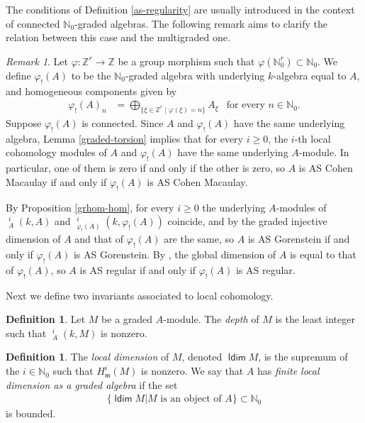 \documentclass[11pt,fleqn]{article}
\theoremstyle{plain}
\theoremstyle{remark}
\newtheorem{Remark}[Theorem]{Remark}
\theoremstyle{definition}
\newtheorem{Definition}[Theorem]{Definition}
\newcommand\NN{\mathbb N}
\newcommand\ZZ{\mathbb Z}
\renewcommand\to{\longrightarrow}
\renewcommand\phi{\varphi}
\newcommand\m{\mathfrak m}
\DeclareMathOperator\GrExt{\underline{\mathsf{Ext}}}
\DeclareMathOperator\ldim{\mathsf{ldim}}
\begin{document}
The conditions of Definition \ref{as-regularity} are usually introduced in the context
of connected $\NN_0$-graded algebras. The following remark aims to clarify the relation
between this case and the multigraded one.
\begin{Remark}
\label{AS-phi}
Let $\phi: \ZZ^r \to \ZZ$ be a group morphism such that $\phi(\NN_0^r) \subset \NN_0$. We
define $\phi_!(A)$ to be the $\NN_0$-graded algebra with underlying $k$-algebra equal to
$A$, and homogeneous components given by
\begin{align*}
\phi_!(A)_n &= \bigoplus_{\{\xi \in \ZZ^r \mid \phi(\xi) = n\}} A_\xi &\mbox{for every } n
\in \NN_0.
\end{align*}
Suppose $\phi_!(A)$ is connected. Since $A$ and $\phi_!(A)$ have the same underlying
algebra, Lemma \ref{graded-torsion} implies that for every $i \geq 0$, the $i$-th local 
cohomology modules of $A$ and $\phi_!(A)$ have the same underlying $A$-module. In
particular, one of them is zero if and only if the other is zero, so $A$ is AS Cohen
Macaulay if and only if $\phi_!(A)$ is AS Cohen Macaulay. 

By Proposition \ref{grhom-hom}, for every $i \geq 0$ the underlying $A$-modules of
$\GrExt^i_A(k,A)$ and $\GrExt^i_{\phi_!(A)}(k,\phi_!(A))$ coincide, and by \cite{RZ2} the
graded injective dimension of $A$ and that of $\phi_!(A)$ are the same, so $A$ is AS
Gorenstein if and only if $\phi_!(A)$ is AS Gorenstein. By \cite{RZ2}, the global dimension
of $A$ is equal to that of $\phi_!(A)$, so $A$ is AS regular if and only if $\phi_!(A)$ is
AS regular.
\end{Remark}

Next we define two invariants associated to local cohomology.
\begin{Definition}
Let $M$ be a graded $A$-module. The \emph{depth} of $M$ is the least integer such that
$\GrExt^i_A(k,M)$ is nonzero.
\end{Definition}

\begin{Definition}
The \emph{local dimension} of $M$, denoted $\ldim M$, is the supremum of the $i \in \NN_0$
such that $H^i_\m(M)$ is nonzero. We say that $A$ has \emph{finite local dimension as a
graded algebra} if the set 
\begin{align*}
\{\ldim M | M \mbox{ is an object of } A\} \subset \NN_0
\end{align*}
is bounded. 
\end{Definition}
\end{document}
